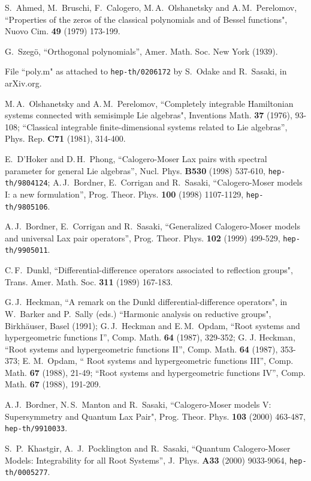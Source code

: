 \documentclass[a4paper,12pt]{article}
\begin{document}
\begin{thebibliography}{99}
S.~Ahmed, M.~Bruschi, F.~Calogero, M.\,A.~Olshanetsky and A.\,M.~Perelomov,
``Properties of the zeros of the classical polynomials and of Bessel
functions",
Nuovo Cim. {\bf 49} (1979) 173-199.

G.~Szeg\"o,
``Orthogonal polynomials'',
Amer. Math. Soc. New York (1939).

File ``poly.m" as attached to {\tt hep-th/0206172} by
S.~Odake and R.~Sasaki, in arXiv.org.

M.\,A.~Olshanetsky and A.\,M.~Perelomov,
``Completely integrable Hamiltonian systems connected with semisimple
Lie algebras",
Inventions Math. {\bf 37} (1976), 93-108;
``Classical integrable finite-dimensional systems related to Lie algebras'',
Phys. Rep.  {\bf C71} (1981), 314-400.

E.~D'Hoker and D.\,H.~Phong,
``Calogero-Moser Lax pairs with spectral parameter for general Lie algebras'',
Nucl. Phys. {\bf B530} (1998) 537-610, {\tt hep-th/9804124};
A.\,J.~Bordner, E.~Corrigan and R.~Sasaki,
``Calogero-Moser models I: a new formulation'',
Prog. Theor. Phys. {\bf 100} (1998) 1107-1129, {\tt hep-th/9805106}.

A.\,J.~Bordner, E.~Corrigan and R.~Sasaki,
``Generalized Calogero-Moser models and  universal Lax pair operators'',
Prog. Theor. Phys. {\bf 102} (1999) 499-529,
{\tt  hep-th/9905011}.

C.\,F.~Dunkl, ``Differential-difference operators associated to reflection
groups",
Trans. Amer. Math. Soc. {\bf 311} (1989) 167-183.

G.\,J.~Heckman,
``A remark on the Dunkl differential-difference operators",
in W.~Barker and P.~Sally (eds.) ``Harmonic analysis on reductive groups",
Birkh\"auser, Basel (1991);
G.\,J.~Heckman and E.\,M.~Opdam,
``Root systems and hypergeometric functions I'',
Comp. Math. {\bf 64} (1987), 329-352;
G. J. Heckman,
``Root systems and hypergeometric functions II'',
Comp. Math. {\bf 64} (1987), 353-373;
E. M.~Opdam,
`` Root systems and hypergeometric functions III'',
Comp. Math. {\bf 67} (1988), 21-49;
``Root systems and hypergeometric functions IV'',
Comp.  Math. {\bf 67} (1988), 191-209.

A.\,J.~Bordner, N.\,S.~Manton and R.~Sasaki,
``Calogero-Moser models V:  Supersymmetry and Quantum Lax Pair",
Prog. Theor. Phys. {\bf 103} (2000) 463-487, {\tt hep-th/9910033}.

S.\, P.~Khastgir, A.\, J.~Pocklington and R.~Sasaki,
``Quantum Calogero-Moser Models: Integrability for all Root Systems'',
J.\ Phys. {\bf A33} (2000) 9033-9064, {\tt hep-th/0005277}.


\end{thebibliography}
\end{document}
